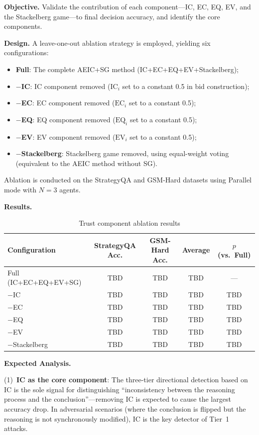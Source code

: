 \documentclass[12pt,a4paper]{article}
\begin{document}
\textbf{Objective.} Validate the contribution of each component---IC, EC, EQ, EV, and the Stackelberg game---to final decision accuracy, and identify the core components.

\textbf{Design.} A leave-one-out ablation strategy is employed, yielding six configurations:

\begin{itemize}[nosep]
    \item \textbf{Full}: The complete AEIC+SG method (IC+EC+EQ+EV+Stackelberg);
    \item \textbf{$-$IC}: IC component removed ($\text{IC}_i$ set to a constant 0.5 in bid construction);
    \item \textbf{$-$EC}: EC component removed ($\text{EC}_i$ set to a constant 0.5);
    \item \textbf{$-$EQ}: EQ component removed ($\text{EQ}_i$ set to a constant 0.5);
    \item \textbf{$-$EV}: EV component removed ($\text{EV}_i$ set to a constant 0.5);
    \item \textbf{$-$Stackelberg}: Stackelberg game removed, using equal-weight voting (equivalent to the AEIC method without SG).
\end{itemize}

Ablation is conducted on the StrategyQA and GSM-Hard datasets using Parallel mode with $N=3$ agents.

\textbf{Results.}

\begin{table}[H]
\centering
\caption{Trust component ablation results}\label{tab:exp4}
\begin{tabular}{lcccc}
\toprule
Configuration & StrategyQA Acc. & GSM-Hard Acc. & Average & $p$ (vs.\ Full) \\
\midrule
Full (IC+EC+EQ+EV+SG) & TBD & TBD & TBD & --- \\
$-$IC & TBD & TBD & TBD & TBD \\
$-$EC & TBD & TBD & TBD & TBD \\
$-$EQ & TBD & TBD & TBD & TBD \\
$-$EV & TBD & TBD & TBD & TBD \\
$-$Stackelberg & TBD & TBD & TBD & TBD \\
\bottomrule
\end{tabular}
\end{table}

\textbf{Expected Analysis.}

(1)~\textbf{IC as the core component}: The three-tier directional detection based on IC is the sole signal for distinguishing ``inconsistency between the reasoning process and the conclusion''---removing IC is expected to cause the largest accuracy drop. In adversarial scenarios (where the conclusion is flipped but the reasoning is not synchronously modified), IC is the key detector of Tier~1 attacks.
\end{document}
